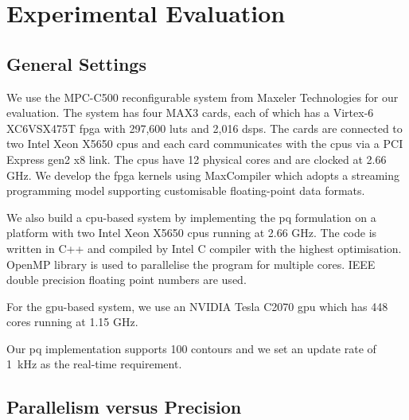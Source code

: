 %


\section{Experimental Evaluation}
\label{sec:precision_evaluation}

\subsection{General Settings}
We use the MPC-C500 reconfigurable system from Maxeler Technologies for our evaluation.
The system has four MAX3 cards, each of which has a Virtex-6 XC6VSX475T \gls{fpga} with 297,600 \glspl{lut} and 2,016 \glspl{dsp}.
The cards are connected to two Intel Xeon X5650 \gls{cpu}s and each card communicates with the \gls{cpu}s via a PCI Express gen2 x8 link. 
The \gls{cpu}s have 12 physical cores and are clocked at 2.66 GHz.
We develop the \gls{fpga} kernels using MaxCompiler which adopts a streaming programming model supporting customisable floating-point data formats.

We also build a \gls{cpu}-based system by implementing the \gls{pq} formulation on a platform with two Intel Xeon X5650 \gls{cpu}s running at 2.66 GHz.
The code is written in C++ and compiled by Intel C compiler with the highest optimisation.
OpenMP library is used to parallelise the program for multiple cores.
IEEE double precision floating point numbers are used.

For the \gls{gpu}-based system, we use an NVIDIA Tesla C2070 \gls{gpu} which has 448 cores running at 1.15 GHz.

Our \gls{pq} implementation supports 100 contours and we set an update rate of 1~kHz as the real-time requirement.

\subsection{Parallelism versus Precision}
\label{sec:precision_parallelism}


